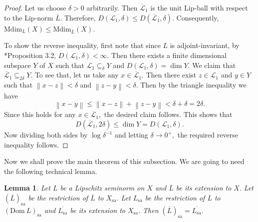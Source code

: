 \documentclass[a4paper,11pt,reqno]{amsart}
\theoremstyle{plain}
\newtheorem{lem}[thm]{Lemma}
\theoremstyle{mainthmstyle}
\theoremstyle{named}
\numberwithin{equation}{section}
\begin{document}
\begin{proof}
Let us choose $\delta > 0$ arbitrarily.  Then $\overline{\mathcal{L}}_1$ is the unit Lip-ball with respect to the Lip-norm $\overline{L}$. Therefore, $D \left (\mathcal {L}_1, \delta \right ) \leq D \left (\overline{\mathcal {L}}_1, \delta \right ).$ Consequently, $\mathrm {Mdim}_{L} (X) \leq \mathrm {Mdim}_{\overline {L}} (X).$

To show the reverse inequality, first note that since $L$ is adjoint-invariant, by \cite{Kerr}*{Proposition 3.2}, $D \left (\mathcal {L}_1, \delta \right ) < \infty.$ Then there exists a finite dimensional subspace $Y$ of $X$ such that $\mathcal {L}_1 \subseteq_{\delta} Y$ and $D \left (\mathcal {L}_1, \delta \right ) = \dim Y.$ We claim that $\overline{\mathcal{L}}_1 \subseteq_{2 \delta} Y.$ To see that, let us take any $x \in \overline{\mathcal{L}}_1.$ Then there exist $z \in \mathcal {L}_1$ and $y \in Y$ such that $\left \|x - z \right \| < \delta$ and $\left \|z - y \right \| < \delta.$ Then by the triangle inequality we have
$$\left \|x - y \right \| \leq \left \|x - z \right \| + \left \|z - y \right \| < \delta + \delta = 2 \delta.$$
Since this holds for any $x \in \overline{\mathcal{L}}_1,$ the desired claim follows. This shows that $$D \left (\overline{\mathcal{L}}_1, 2 \delta \right ) \leq \dim Y = D \left (\mathcal {L}_1, \delta \right ).$$ Now dividing both sides by $\log \delta^{-1}$ and letting $\delta \rightarrow 0^{+},$ the required reverse inequality follows. 
\end{proof}
Now we shall prove the main theorem of this subsection. We are going to need the following technical lemma.
\begin{lem}
Let $L$ be a Lipschitz seminorm on $X$ and $\overline {L}$ be its extension to $X.$ Let $(\overline {L})_{\mathrm {sa}}$ be the restriction of $\overline {L}$ to $X_{\mathrm {sa}}.$ Let $L_{\mathrm {sa}}$ be the restriction of $L$ to $\left (\mathrm {Dom}\ L \right )_{\mathrm {sa}}$ and $\overline {L_{\mathrm {sa}}}$ be its extension to $X_{\mathrm {sa}}.$ Then $(\overline {L})_{\mathrm {sa}} = \overline {L_{\mathrm {sa}}}.$
\end{lem}
\end{document}
